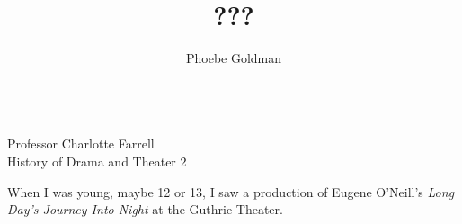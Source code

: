 \documentclass[letterpaper, 12pt]{article}
\title{???}
\author{Phoebe Goldman}
\date{\DTMDate{2020-05-13}}
\newcommand{\ldjin}{\textit{Long Day's Journey Into Night}}
\newcommand{\oneill}{O'Neill}
\newcommand{\theprof}{Professor Charlotte Farrell}
\newcommand{\theclass}{History of Drama and Theater 2}
\newcommand{\mlatitle}{\noindent\theauthor{}\hspace*{2cm}
\\\noindent\theprof{}\hspace*{2cm}
\\\noindent\theclass{}\hspace*{2cm}
\\\noindent\thedate{}\hspace*{2cm}
\begin{center}
  \thetitle{}
\end{center}}
\begin{document}
\RaggedRight
\thispagestyle{plain}

\mlatitle{}

When I was young, maybe 12 or 13, I saw a production of Eugene \oneill{}'s
\ldjin{} at the Guthrie Theater.

\printbibliography{}
\end{document}
